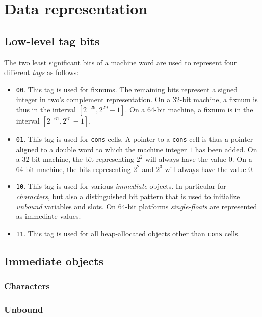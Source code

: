 \chapter{Data representation}
\label{chap-data-representation}

\section{Low-level tag bits}

The two least significant bits of a machine word are used to represent
four different \emph{tags} as follows:

\begin{itemize}
\item \texttt{00}.  This tag is used for fixnums.  The remaining bits
  represent a signed integer in two's complement representation.  On a
  32-bit machine, a fixnum is thus in the interval $[2^{-29}, 2^{29} -
    1]$.  On a 64-bit machine, a fixnum is in the interval $[2^{-61}, 2^{61} -
    1]$.  
\item \texttt{01}.  This tag is used for \texttt{cons} cells.  A
  pointer to a \texttt{cons} cell is thus a pointer aligned to a
  double word to which the machine integer $1$ has been added.  On a
  32-bit machine, the bit representing $2^2$ will always have the
  value $0$.  On a 64-bit machine, the bits representing $2^2$ and
  $2^3$ will always have the value $0$.
\item \texttt{10}.  This tag is used for various \emph{immediate}
  objects.  In particular for \emph{characters}, but also a
  distinguished bit pattern that is used to initialize \emph{unbound}
  variables and slots.  On 64-bit platforms \emph{single-floats} are
  represented as immediate values. 
\item \texttt{11}.  This tag is used for all heap-allocated objects
  other than \texttt{cons} cells.
\end{itemize}

\section{Immediate objects}

\subsection{Characters}

\subsection{Unbound}


